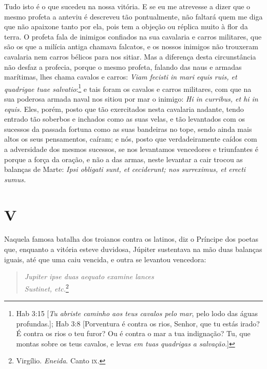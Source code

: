 Tudo isto é o que sucedeu na nossa vitória. E se eu me atrevesse a
dizer que o mesmo profeta a anteviu é descreveu tão pontualmente, não
faltará quem me diga que não apaixone tanto por ela, pois tem a objeção
ou réplica muito à flor da terra. O profeta fala de inimigos confiados
na sua cavalaria e carros militares, que são os que a milícia antiga
chamava falcatos, e os nossos inimigos não trouxeram cavalaria nem
carros bélicos para nos sitiar. Mas a diferença desta circunstância não
desfaz a profecia, porque o mesmo profeta, falando das naus e armadas
marítimas, lhes chama cavalos e carros: \emph{Viam fecisti in mari equis ruis,
et quadrigae tuae salvatio}:\footnote{Hab 3:15 [\textit{Tu abriste caminho aos teus cavalos pelo mar}, pelo lodo das águas profundas.]; Hab 3:8 [Porventura é contra os rios, Senhor, que tu estás irado? É contra os rios o teu furor? Ou é contra o mar a tua indignação? Tu, que montas sobre os teus cavalos, e levas \textit{em tuas quadrigas a salvação}.]} e tais foram os cavalos e carros
militares, com que na sua poderosa armada naval nos sitiou por mar o
inimigo: \emph{Hi in curribus, et hi in equis.} Eles, porém, posto que
tão exercitados nesta cavalaria nadante, tendo entrado tão soberbos e
inchados como as suas velas, e tão levantados com os sucessos da passada
fortuna como as suas bandeiras no tope, sendo ainda mais altos os seus
pensamentos, caíram; e nós, posto que verdadeiramente caídos com a
adversidade dos mesmos sucessos, se nos levantamos vencedores e
triunfantes é porque a força da oração, e não a das armas, neste
levantar a cair trocou as balanças de Marte: \emph{Ipsi obligati sunt,
et ceciderunt; nos surreximus, et erecti sumus.}

\section*{V}

Naquela famosa batalha dos troianos contra os latinos, diz o Príncipe
dos poetas que, enquanto a vitória esteve duvidosa, Júpiter sustentava
na mão duas balanças iguais, até que uma caiu vencida, e outra se
levantou vencedora:

\begin{verse}
\emph{Jupiter ipse duas aequato examine lances}\\
\emph{Sustinet, etc.}\footnote{Virgílio. \textit{Eneida}. Canto \textsc{ix}.}
\end{verse}

